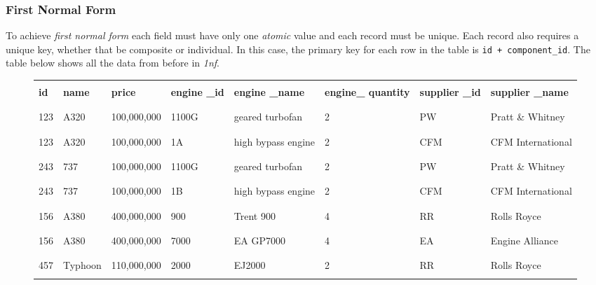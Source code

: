 \documentclass[9pt]{article}
\begin{document}
\subsubsection{First Normal Form}
\label{sec:org2198137}

To achieve \emph{first normal form} each field must have only one \emph{atomic} value and each record must be unique. Each record also requires a unique key, whether that be composite or individual. In this case, the primary key for each row in the table is \texttt{id + component\_id}. The table below shows all the data from before in \emph{1nf}.

\begin{figure}[H]
\begin{center}
\begin{longtable}{ |C{0.05\textwidth}|C{0.08\textwidth}|C{0.105\textwidth}|C{0.1\textwidth}|C{0.1\textwidth}|C{0.1\textwidth}|C{0.07\textwidth}|C{0.1\textwidth}| }
\hline
&&&&&&&\\
\textbf{id} & \textbf{name} & \textbf{price} & \textbf{engine \_id} & \textbf{engine \_name} & \textbf{engine\_ quantity} & \textbf{supplier \_id} & \textbf{supplier \_name}\\
&&&&&&&\\
\hline
&&&&&&&\\
123 & A320 & 100,000,000 & 1100G & geared turbofan & 2 & PW & Pratt \& Whitney\\
&&&&&&&\\
\hline
&&&&&&&\\
123 & A320 & 100,000,000 & 1A & high bypass engine & 2 & CFM & CFM International\\
&&&&&&&\\
\hline
&&&&&&&\\
243 & 737 & 100,000,000 & 1100G & geared turbofan & 2 & PW & Pratt \& Whitney\\
&&&&&&&\\
\hline
&&&&&&&\\
243 & 737 & 100,000,000 & 1B & high bypass engine & 2 & CFM & CFM International\\
&&&&&&&\\
\hline
&&&&&&&\\
156 & A380 & 400,000,000 & 900 & Trent 900 & 4 & RR & Rolls Royce\\
&&&&&&&\\
\hline
&&&&&&&\\
156 & A380 & 400,000,000 & 7000 & EA GP7000 & 4 & EA & Engine Alliance\\
&&&&&&&\\
\hline
&&&&&&&\\
457 & Typhoon & 110,000,000 & 2000 & EJ2000 & 2 & RR & Rolls Royce\\
&&&&&&&\\
\hline
\end{longtable}
\end{center}
\end{figure}
\end{document}

